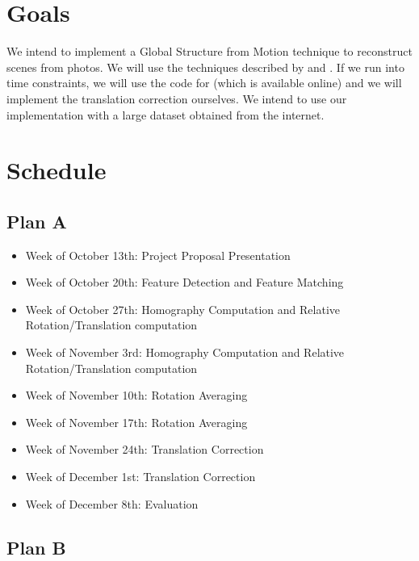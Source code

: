 \documentclass[conference, 12pt]{acmsiggraph}
\begin{document}
\section{Goals}

We intend to implement a Global Structure from Motion technique to reconstruct scenes from photos. We will use the techniques described by \cite{rotation} and \cite{translation}. If we run into time constraints, we will use the code for \cite{rotation} (which is available online) and we will implement the translation correction ourselves. We intend to use our implementation with a large dataset obtained from the internet.

\section{Schedule}

\subsection{Plan A}

\begin{itemize}
	\item {Week of October 13th}: Project Proposal Presentation
	\item {Week of October 20th}: Feature Detection and Feature Matching
	\item {Week of October 27th}: Homography Computation and Relative Rotation/Translation computation
	\item {Week of November 3rd}: Homography Computation and Relative Rotation/Translation computation
	\item {Week of November 10th}: Rotation Averaging
	\item {Week of November 17th}: Rotation Averaging
	\item {Week of November 24th}: Translation Correction
	\item {Week of December 1st}: Translation Correction
	\item {Week of December 8th}: Evaluation
\end{itemize}

\subsection{Plan B}
\end{document}
